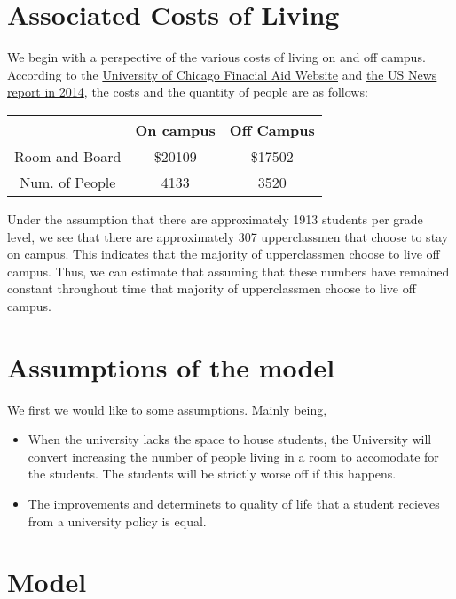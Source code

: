 \documentclass[12pt]{article}
\begin{document}
\section{Associated Costs of Living}
We begin with a perspective of the various costs of living on and off campus. According to the \href{https://financialaid.uchicago.edu/undergraduate/how-aid-works/undergraduate-costs/}{University of Chicago Finacial Aid Website} and \href{https://web.archive.org/web/20160304084033/http://colleges.usnews.rankingsandreviews.com/best-colleges/university-of-chicago-1774/student-life}{the US News report in 2014}, the costs and the quantity of people are as follows: 
\begin{table}[H]
    \centering
    \begin{tabular}{c|c|c}
        & On campus & Off Campus\\
        \hline
        Room and Board & \$20109 & \$17502\\ 
        \hline
        Num. of People & 4133 & 3520\\
        \hline
    \end{tabular}
\end{table}
Under the assumption that there are approximately 1913 students per grade level, we see that there are approximately 307 upperclassmen that choose to stay on campus. This indicates that the majority of upperclassmen choose to live off campus. Thus, we can estimate that assuming that these numbers have remained constant throughout time that majority of upperclassmen choose to live off campus. 
\section{Assumptions of the model}
We first we would like to some assumptions. Mainly being,
\begin{itemize}
    \item When the university lacks the space to house students, the University will convert increasing the number of people living in a room to accomodate for the students. The students will be strictly worse off if this happens. 
    \item The improvements and determinets to quality of life that a student recieves from a university policy is equal. 
\end{itemize}
\section{Model}
\end{document}
